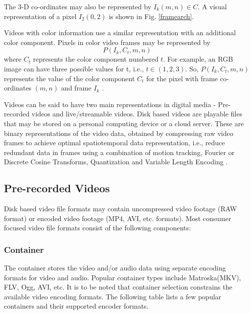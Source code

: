 \documentclass[letterpaper,12pt,titlepage,oneside,final]{report}
\begin{document}
        The 3-D co-ordinates may also be represented by $I_k(m, n) \in C$. A visual representation of a pixel $I_2(0,2)$ is shown in Fig. \ref{framearch}\cite{Kundur}.
        
        Videos with color information use a similar representation with an additional color component. Pixels in color video frames may be represented by $$P(I_k, C_t, m, n )$$ where $C_t$ represents the color component numbered $t$. For example, an RGB image can have three possible values for t, i.e., $t \in (1, 2, 3)$. So, $P(I_k, C_t, m, n)$ represents the value of the color component $C_t$ for the pixel with frame co-ordinates $(m, n)$ and frame $I_k$ \cite{Lefevre2003}.

        Videos can be said to have two main representations in digital media - Pre-recorded videos and live/streamable videos. Disk based videos are playable files that may be stored on a personal computing device or a cloud server. These are binary representations of the video data, obtained by compressing raw video frames to achieve optimal spatiotemporal data representation, i.e., reduce redundant data in frames using a combination of motion tracking, Fourier or Discrete Cosine Transforms, Quantization and Variable Length Encoding \cite{Choupani}.
        \subsection{Pre-recorded Videos}
            Disk based video file formats may contain uncompressed video footage (RAW format) or encoded video footage (MP4, AVI, etc. formats). Most consumer focused video file formats consist of the following components:
            \subsubsection{Container}
                The container stores the video and/or audio data using separate encoding formats for video and audio. Popular container types include Matroska(MKV), FLV, Ogg, AVI, etc. It is to be noted that container selection constrains the available video encoding formats. The following table lists a few popular containers and their supported encoder formats.
\end{document}
